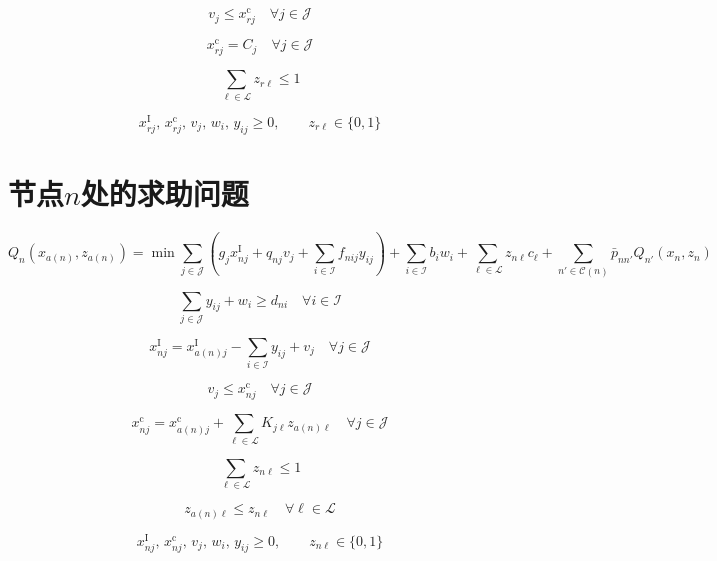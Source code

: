 \documentclass{article}
\begin{document}
\begin{equation}
v_j \le x_{rj}^{\mathrm c}
\quad \forall j \in \mathcal J
\tag{9c}
\end{equation}

\begin{equation}
x_{rj}^{\mathrm c} = C_j
\quad \forall j \in \mathcal J
\tag{9d}
\end{equation}

\begin{equation}
\sum_{\ell \in \mathcal L} z_{r\ell} \le 1
\tag{9e}
\end{equation}

\begin{equation}
x_{rj}^{\mathrm I},\, x_{rj}^{\mathrm c},\, v_j,\, w_i,\, y_{ij} \ge 0,\qquad
z_{r\ell} \in \{0,1\}
\tag{9f}
\end{equation}

\section*{节点$n$处的求助问题}
\begin{equation}
Q_n(x_{a(n)}, z_{a(n)}) =
\min
\sum_{j \in \mathcal J}
\left(
g_j x_{nj}^{\mathrm I} + q_{nj} v_j + \sum_{i \in \mathcal I} f_{nij} y_{ij}
\right)
+
\sum_{i \in \mathcal I} b_i w_i
+
\sum_{\ell \in \mathcal L} z_{n\ell} c_\ell
+
\sum_{n' \in \mathcal C(n)} \bar p_{nn'} Q_{n'}(x_n, z_n)
\tag{10-Obj}
\end{equation}

\begin{equation}
\sum_{j \in \mathcal J} y_{ij} + w_i \ge d_{ni}
\quad \forall i \in \mathcal I
\tag{10a}
\end{equation}

\begin{equation}
x_{nj}^{\mathrm I} = x_{a(n)j}^{\mathrm I} - \sum_{i \in \mathcal I} y_{ij} + v_j
\quad \forall j \in \mathcal J
\tag{10b}
\end{equation}

\begin{equation}
v_j \le x_{nj}^{\mathrm c}
\quad \forall j \in \mathcal J
\tag{10c}
\end{equation}

\begin{equation}
x_{nj}^{\mathrm c} = x_{a(n)j}^{\mathrm c} + \sum_{\ell \in \mathcal L} K_{j\ell} z_{a(n)\ell}
\quad \forall j \in \mathcal J
\tag{10d}
\end{equation}

\begin{equation}
\sum_{\ell \in \mathcal L} z_{n\ell} \le 1
\tag{10e}
\end{equation}

\begin{equation}
z_{a(n)\ell} \le z_{n\ell}
\quad \forall \ell \in \mathcal L
\tag{10f}
\end{equation}

\begin{equation}
x_{nj}^{\mathrm I},\, x_{nj}^{\mathrm c},\, v_j,\, w_i,\, y_{ij} \ge 0,\qquad
z_{n\ell} \in \{0,1\}
\tag{10g}
\end{equation}
\end{document}
